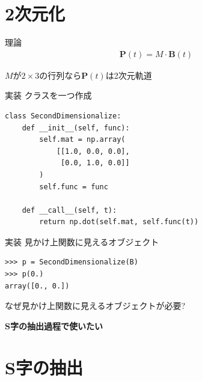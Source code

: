 \documentclass[12pt, xetex, xcolor=pdftex, dvipsnames]{beamer}
\renewcommand{\vec}{\textbf} %
\begin{document}
\section{2次元化}
\begin{frame}{理論}
    \begin{align}
        \vec{P}(t) = M \cdot \vec{B}(t)
    \end{align}

    $M$が$2 \times 3$の行列なら$\vec{P}(t)$は2次元軌道
\end{frame}
\begin{frame}[fragile]{実装}
クラスを一つ作成
\begin{lstlisting}
class SecondDimensionalize:
    def __init__(self, func):
        self.mat = np.array(
            [[1.0, 0.0, 0.0],
             [0.0, 1.0, 0.0]]
        )
        self.func = func

    def __call__(self, t):
        return np.dot(self.mat, self.func(t))
\end{lstlisting}
\end{frame}
\begin{frame}[fragile]{実装}
見かけ上関数に見えるオブジェクト

\begin{lstlisting}
>>> p = SecondDimensionalize(B)
>>> p(0.)
array([0., 0.])
\end{lstlisting}
\end{frame}
\begin{frame}
    なぜ見かけ上関数に見えるオブジェクトが必要?

    \pause

    \alert{\textbf{S字の抽出過程で使いたい}}
\end{frame}

\section{S字の抽出}
\end{document}
